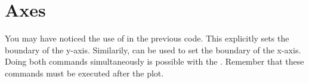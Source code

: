 \section*{Axes} %

You may have noticed the use of  in the previous code. This explicitly sets the boundary of the y-axis. Similarily,  can be used to set the boundary of the x-axis. 
Doing both commands simultaneously is possible with the . 
Remember that these commands must be executed after the plot. 

\begin{comment} %
\begin{table}[H] 
\centering
\begin{tabular}{r|l}
    Function & Description\\
    \hline
    \li{legend()} & Place a legend in the plot\\
    \li{title()} & Add a title to the plot\\
    \li{xlim()} & Set the limits of the $x$-axis\\
    \li{ylim()} & Set the limits of the $y$-axis\\
    \li{xlabel()} & Add a label to the $x$-axis\\
    \li{ylabel()} & Add a label to the $y$-axis
\end{tabular}
\end{table}
\end{comment}


